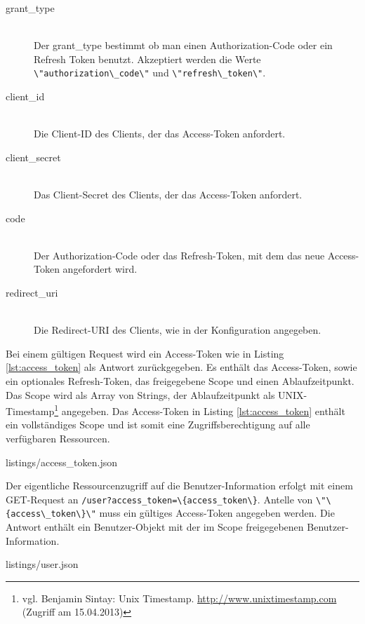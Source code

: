 \documentclass[12pt,a4paper,pointednumbers,abstracton]{scrartcl}
\newcommand{\code}[1]{\small\lstinline[style=InlinePHP]!#1!\normalsize}
\begin{document}
\begin{description}
	\item[grant\_type] \hfill \\
		Der grant\_type bestimmt ob man einen Authorization-Code oder ein Refresh Token benutzt.
		Akzeptiert werden die Werte \code{\"authorization\_code\"} und \code{\"refresh\_token\"}.
	\item[client\_id] \hfill \\
		Die Client-ID des Clients, der das Access-Token anfordert.
	\item[client\_secret] \hfill \\
		Das Client-Secret des Clients, der das Access-Token anfordert.
	\item[code] \hfill \\
		Der Authorization-Code oder das Refresh-Token, mit dem das neue Access-Token angefordert wird.
	\item[redirect\_uri] \hfill \\
		Die Redirect-URI des Clients, wie in der Konfiguration angegeben.
\end{description}

Bei einem gültigen Request wird ein Access-Token wie in Listing \ref{lst:access_token} als Antwort zurückgegeben.
Es enthält das Access-Token, sowie ein optionales Refresh-Token, das freigegebene Scope und einen Ablaufzeitpunkt.
Das Scope wird als Array von Strings, der Ablaufzeitpunkt als UNIX-Timestamp\footnote{vgl. Benjamin Sintay: Unix Timestamp. \url{http://www.unixtimestamp.com} (Zugriff am 15.04.2013)} angegeben.
Das Access-Token in Listing \ref{lst:access_token} enthält ein vollständiges Scope und ist somit eine Zugriffsberechtigung auf alle verfügbaren Ressourcen.

\begin{minipage}{\textwidth}
	
	{listings/access_token.json}
\end{minipage}

Der eigentliche Ressourcenzugriff auf die Benutzer-Information erfolgt mit einem GET-Request an \code{/user?access_token=\{access_token\}}.
Antelle von \code{\"\{access\_token\}\"} muss ein gültiges Access-Token angegeben werden.
Die Antwort enthält ein Benutzer-Objekt mit der im Scope freigegebenen Benutzer-Information.

\begin{minipage}{\textwidth}
	
	{listings/user.json}
\end{minipage}
\end{document}
